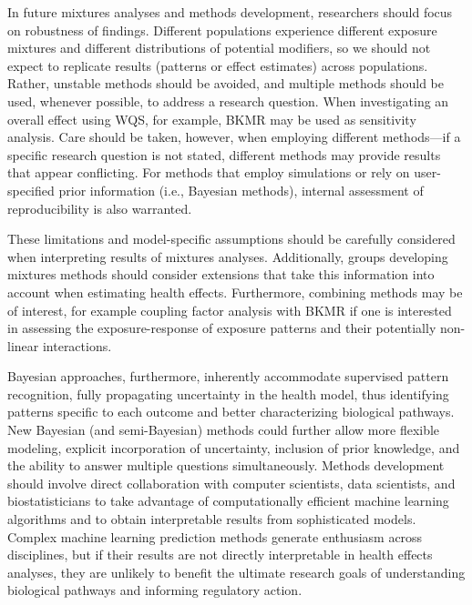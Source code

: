 In future mixtures analyses and methods development, researchers should focus on robustness of findings. Different populations experience different exposure mixtures and different distributions of potential modifiers, so we should not expect to replicate results (patterns or effect estimates) across populations. Rather, unstable methods should be avoided, and multiple methods should be used, whenever possible, to address a research question. When investigating an overall effect using WQS, for example, BKMR may be used as sensitivity analysis. Care should be taken, however, when employing different methods---if a specific research question is not stated, different methods may provide results that appear conflicting. For methods that employ simulations or rely on user-specified prior information (i.e., Bayesian methods), internal assessment of reproducibility is also warranted. 

These limitations and model-specific assumptions should be carefully considered when interpreting results of mixtures analyses. Additionally, groups developing mixtures methods should consider extensions that take this information into account when estimating health effects. Furthermore, combining methods may be of interest, for example coupling factor analysis with BKMR if one is interested in assessing the exposure-response of exposure patterns and their potentially non-linear interactions. 

Bayesian approaches, furthermore, inherently accommodate supervised pattern recognition, fully propagating uncertainty in the health model, thus identifying patterns specific to each outcome and better characterizing biological pathways. New Bayesian (and semi-Bayesian) methods could further allow more flexible modeling, explicit incorporation of uncertainty, inclusion of prior knowledge, and the ability to answer multiple questions simultaneously. Methods development should involve direct collaboration with computer scientists, data scientists, and biostatisticians to take advantage of computationally efficient machine learning algorithms and to obtain interpretable results from sophisticated models. Complex machine learning prediction methods generate enthusiasm across disciplines, but if their results are not directly interpretable in health effects analyses, they are unlikely to benefit the ultimate research goals of understanding biological pathways and informing regulatory action.

